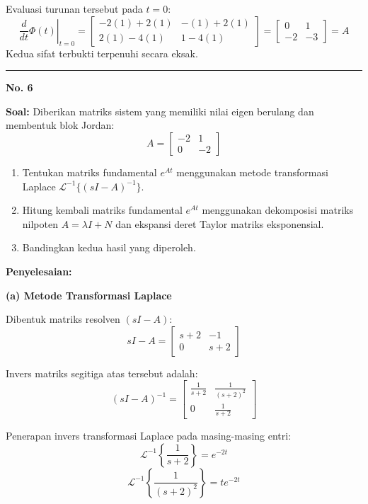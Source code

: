 \documentclass[11pt,a4paper]{article}
\begin{document}
Evaluasi turunan tersebut pada $t = 0$:
$$\left.\frac{d}{dt}\Phi(t)\right|_{t=0} = \begin{bmatrix} -2(1) + 2(1) & -(1) + 2(1) \\ 2(1) - 4(1) & 1 - 4(1) \end{bmatrix} = \begin{bmatrix} 0 & 1 \\ -2 & -3 \end{bmatrix} = A$$
Kedua sifat terbukti terpenuhi secara eksak.

\vspace{12pt}
\hrule
\vspace{10pt}

\textbf{\large No. 6}

\textbf{Soal:}  
Diberikan matriks sistem yang memiliki nilai eigen berulang dan membentuk blok Jordan:
$$A = \begin{bmatrix} -2 & 1 \\ 0 & -2 \end{bmatrix}$$
\begin{enumerate}[label=(\alph*)]
    \item Tentukan matriks fundamental $e^{At}$ menggunakan metode transformasi Laplace $\mathcal{L}^{-1}\{(sI - A)^{-1}\}$.
    \item Hitung kembali matriks fundamental $e^{At}$ menggunakan dekomposisi matriks nilpoten $A = \lambda I + N$ dan ekspansi deret Taylor matriks eksponensial.
    \item Bandingkan kedua hasil yang diperoleh.
\end{enumerate}

\textbf{Penyelesaian:}

\textbf{(a) Metode Transformasi Laplace}

Dibentuk matriks resolven $(sI - A)$:
$$sI - A = \begin{bmatrix} s+2 & -1 \\ 0 & s+2 \end{bmatrix}$$

Invers matriks segitiga atas tersebut adalah:
$$(sI - A)^{-1} = \begin{bmatrix} \frac{1}{s+2} & \frac{1}{(s+2)^2} \\ 0 & \frac{1}{s+2} \end{bmatrix}$$

Penerapan invers transformasi Laplace pada masing-masing entri:
$$\mathcal{L}^{-1}\left\{ \frac{1}{s+2} \right\} = e^{-2t}$$
$$\mathcal{L}^{-1}\left\{ \frac{1}{(s+2)^2} \right\} = t e^{-2t}$$
\end{document}
